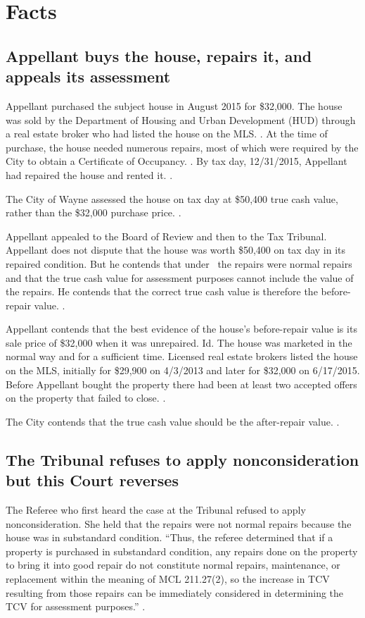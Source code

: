 \documentclass[12pt,\documentclassflag]{michiganCourtOfAppealsBrief}
\begin{document}
\section{Facts}
\subsection{Appellant buys the house, repairs it, and appeals its assessment}

Appellant purchased the subject house in August 2015 for \$32,000. The house was sold by the Department of Housing and Urban Development (HUD) through a real estate broker who had listed the house on the MLS. \mlsListing[]. At the time of purchase, the house needed numerous repairs, most of which were required by the City to obtain a Certificate of Occupancy. \repairs[]. By tax day, 12/31/2015, Appellant had repaired the house and rented it. \foj[4-5].

The City of Wayne assessed the house on tax day at \$50,400 true cash value, rather than the \$32,000 purchase price. \boardOfReviewDecision.

Appellant appealed to the Board of Review and then to the Tax Tribunal. Appellant does not dispute that the house was worth \$50,400 on tax day in its repaired condition. But he contends that under \mathieuGast\ the repairs were normal repairs and that the true cash value for assessment purposes cannot include the value of the repairs. He contends that the correct true cash value is therefore the before-repair value. \explanatoryLetter[2].

Appellant contends that the best evidence of the house's before-repair value is its sale price of \$32,000 when it was unrepaired. Id. The house was marketed in the normal way and for a sufficient time. Licensed real estate brokers listed the house on the MLS, initially for \$29,900 on 4/3/2013 and later for \$32,000 on 6/17/2015. Before Appellant bought the property there had been at least two accepted offers on the property that failed to close. \mlsHistory[]. 

The City contends that the true cash value should be the after-repair value. \cityEvidence.

\subsection{The Tribunal refuses to apply nonconsideration but this Court reverses}

The Referee who first heard the case at the Tribunal refused to apply nonconsideration. She held that the repairs were not normal repairs because the house was in substandard condition. ``Thus, the referee determined that if a property is purchased in substandard condition, any repairs done on the property to bring it into good repair do not constitute normal repairs, maintenance, or replacement within the meaning of MCL 211.27(2), so the increase in TCV resulting from those repairs can be immediately considered in determining the TCV for assessment purposes.'' .
\end{document}
